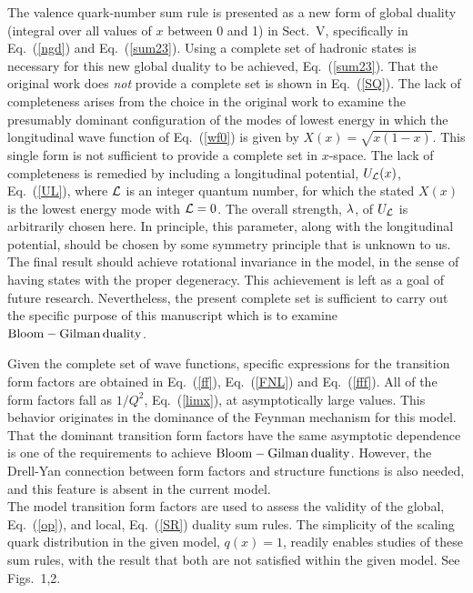 \documentclass[aps,prd,amsmath,longbibliography]{revtex4-1}
\newcommand{\eq}[1]{Eq.~(\ref{#1})}
\def\BGs{\rm Bloom-Gilman\,duality}
\begin{document}
{ The valence quark-number sum rule is presented as a new form of global duality (integral over all values of $x$ between 0 and 1) in Sect.~V, specifically in \eq{ngd} and \eq{sum23}. Using a complete set of hadronic states is necessary for this new global duality to be achieved, \eq{sum23}.  That the original work does {\it not} provide a complete set is shown in \eq{SQ}. The lack of completeness arises from the choice in the original work to examine the presumably dominant configuration of the  modes of lowest energy  in which the longitudinal wave  function of \eq{wf0} is given by $X(x)=\sqrt{x(1-x)}$. This single form is not sufficient  to provide a complete set in $x$-space. The lack of completeness is remedied by including a longitudinal potential, $U_{\cal L}(x)$, \eq{UL}, where ${\cal L}$ is an integer quantum number, 
  for which the stated $X(x)$ is the lowest energy mode with ${\cal L}=0$.  The overall strength, $\lambda$, of $U_{\cal L}$ is arbitrarily chosen here. In principle, this parameter, along with the longitudinal potential, should be chosen by some symmetry principle that is unknown to us. The final result should  achieve rotational invariance in the model, in the sense of having states with the proper degeneracy. This  achievement is left as a  goal of future research. Nevertheless, the present complete set is sufficient to carry out the specific purpose of this manuscript which is to examine $\BGs$.
  
   
Given the complete set of wave functions, specific expressions for the transition form factors are obtained  in \eq{ff}, \eq{FNL} and \eq{fff}.  All of the form factors fall as $1/Q^2$, \eq{limx}, at asymptotically large values. This behavior  originates in the dominance of the Feynman mechanism for this model.  That the dominant transition form factors have the same asymptotic dependence is one of the requirements to achieve $\BGs$. However, the Drell-Yan connection between form factors and structure functions is also needed, and this feature is absent in the current model.\\

The model  transition form factors are used to assess the validity of the  global, \eq{op}, and local, \eq{SR} duality sum rules. The simplicity of the  scaling quark distribution in the given model, $q(x)=1$, readily  enables studies of these sum rules, with the result that both are not satisfied within the  given model.  See Figs.~1,2.  %

}
\end{document}
